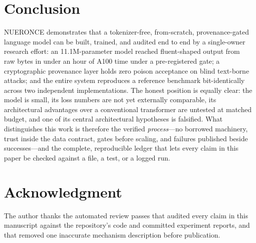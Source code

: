 \documentclass[journal]{IEEEtran}
\begin{document}
\section{Conclusion}

NUERONCE demonstrates that a tokenizer-free, from-scratch, provenance-gated language model can be built, trained, and audited end to end by a single-owner research effort: an 11.1M-parameter model reached fluent-shaped output from raw bytes in under an hour of A100 time under a pre-registered gate; a cryptographic provenance layer holds zero poison acceptance on blind text-borne attacks; and the entire system reproduces a reference benchmark bit-identically across two independent implementations. The honest position is equally clear: the model is small, its loss numbers are not yet externally comparable, its architectural advantages over a conventional transformer are untested at matched budget, and one of its central architectural hypotheses is falsified. What distinguishes this work is therefore the verified \emph{process}---no borrowed machinery, trust inside the data contract, gates before scaling, and failures published beside successes---and the complete, reproducible ledger that lets every claim in this paper be checked against a file, a test, or a logged run.

\section*{Acknowledgment}
The author thanks the automated review passes that audited every claim in this manuscript against the repository's code and committed experiment reports, and that removed one inaccurate mechanism description before publication.
\end{document}

